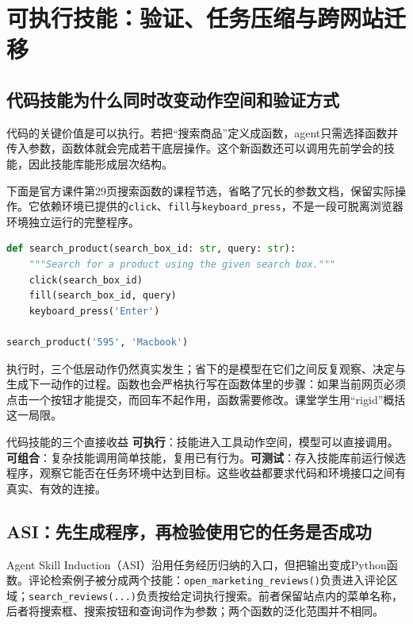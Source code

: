 \documentclass[11pt,a4paper]{article}
\begin{document}
\clearpage
\section{可执行技能：验证、任务压缩与跨网站迁移}

\subsection{代码技能为什么同时改变动作空间和验证方式}
代码的关键价值是可以执行。若把“搜索商品”定义成函数，agent只需选择函数并传入参数，函数体就会完成若干底层操作。这个新函数还可以调用先前学会的技能，因此技能库能形成层次结构。

下面是官方课件第29页搜索函数的课程节选，省略了冗长的参数文档，保留实际操作。它依赖环境已提供的\texttt{click}、\texttt{fill}与\texttt{keyboard\_press}，不是一段可脱离浏览器环境独立运行的完整程序。

\par\noindent\begin{minipage}{\linewidth}
\begin{lstlisting}[language=Python,caption={课程节选：一次搜索技能调用执行三个低层操作（官方课件第29页，省略文档细节）}]
def search_product(search_box_id: str, query: str):
    """Search for a product using the given search box."""
    click(search_box_id)
    fill(search_box_id, query)
    keyboard_press('Enter')

search_product('595', 'Macbook')
\end{lstlisting}
\end{minipage}

执行时，三个低层动作仍然真实发生；省下的是模型在它们之间反复观察、决定与生成下一动作的过程。函数也会严格执行写在函数体里的步骤：如果当前网页必须点击一个按钮才能提交，而回车不起作用，函数需要修改。课堂学生用“rigid”概括这一局限。

\begin{importantbox}{代码技能的三个直接收益}
\textbf{可执行}：技能进入工具动作空间，模型可以直接调用。\textbf{可组合}：复杂技能调用简单技能，复用已有行为。\textbf{可测试}：存入技能库前运行候选程序，观察它能否在任务环境中达到目标。这些收益都要求代码和环境接口之间有真实、有效的连接。
\end{importantbox}

\subsection{ASI：先生成程序，再检验使用它的任务是否成功}
Agent Skill Induction（ASI）沿用任务经历归纳的入口，但把输出变成Python函数。评论检索例子被分成两个技能：\texttt{open\_marketing\_reviews()}负责进入评论区域；\texttt{search\_reviews(...)}负责按给定词执行搜索。前者保留站点内的菜单名称，后者将搜索框、搜索按钮和查询词作为参数；两个函数的泛化范围并不相同。
\end{document}
